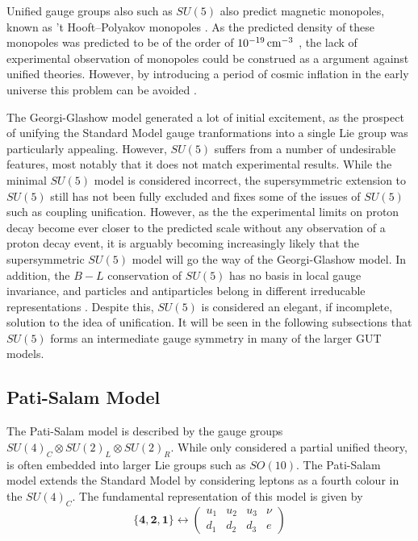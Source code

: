 \documentclass{article}
\begin{document}
Unified gauge groups also such as $SU(5)$ also predict magnetic monopoles, known as 't Hooft–Polyakov monopoles \cite{GUTMonopoles}. As the predicted density of these monopoles was predicted to be of the order of $10^{-19}\,\rm{cm}^{-3}$ \cite{GUTMonopoleDensity}, the lack of experimental observation of monopoles could be construed as a argument against unified theories. However, by introducing a period of cosmic inflation in the early universe this problem can be avoided \cite{InflationMonopole}.

The Georgi-Glashow model generated a lot of initial excitement, as the prospect of unifying the Standard Model gauge tranformations into a single Lie group was particularly appealing. However, $SU(5)$ suffers from a number of undesirable features, most notably that it does not match experimental results. While the minimal $SU(5)$ model is considered incorrect, the supersymmetric extension to $SU(5)$ still has not been fully excluded and fixes some of the issues of $SU(5)$ such as coupling unification. However, as the the experimental limits on proton decay become ever closer to the predicted scale without any observation of a proton decay event, it is arguably becoming increasingly likely that the supersymmetric $SU(5)$ model will go the way of the Georgi-Glashow model.
In addition, the $B-L$ conservation of $SU(5)$ has no basis in local gauge invariance, and particles and antiparticles belong in different irreducable representations \cite{GUTBaryonAsym}. Despite this, $SU(5)$ is considered an elegant, if incomplete, solution to the idea of unification. It will be seen in the following subsections that $SU(5)$ forms an intermediate gauge symmetry in many of the larger GUT models.

\subsection{Pati-Salam Model}%
\label{sec:GUT_PS}
The Pati-Salam model \cite{PatiSalam} is described by the gauge groups $SU(4)_C\otimes SU(2)_L\otimes SU(2)_R$. While only considered a partial unified theory, is often embedded into larger Lie groups such as $SO(10)$. The Pati-Salam model extends the Standard Model by considering leptons as a fourth colour in the $SU(4)_C$. The fundamental representation of this model is given by
\begin{equation}
\{\bm{4},\bm{2},\bm{1}\} \leftrightarrow 
\left(\begin{matrix}
u_1 & u_2 & u_3 & \nu \\
d_1 & d_2 & d_3 & e
\end{matrix}\right)
\end{equation}
\end{document}
